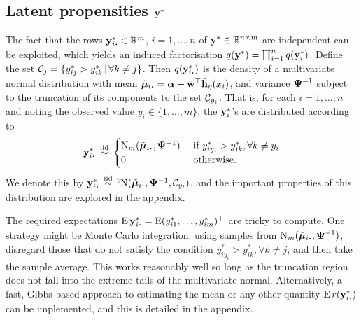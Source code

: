 \subsection{Latent propensities \texorpdfstring{${\mathbf y}^*$}{$y^*$}}

The fact that the rows $\by_{i \bigcdot}^* \in \bbR^m$, $i=1,\dots,n$ of ${\mathbf y}^* \in \mathbb{R}^{n \times m}$ are independent can be exploited, which yields an induced factorisation $q({\mathbf y}^*) = \prod_{i=1}^n q({\mathbf y}_i^*)$.
Define the set ${\mathcal C}_j = \{y_{ij}^* > y_{ik}^* \,|\, \forall k\neq j \}$.
Then $q(\by_{i \bigcdot}^*)$ is the density of a multivariate normal distribution with mean $\tilde\bmu_{i \bigcdot} = \tilde\balpha + \tilde\bw^\top \tilde \bh_\eta(x_i)$, and variance ${\bm\Psi}^{-1}$ subject to the truncation of its components to the set ${\mathcal C}_{y_i}$.
That is, for each $i=1,\dots,n$ and noting the observed value $y_i \in \{1,\dots,m\}$, the ${\mathbf y}_i^*$'s are distributed according to
\begin{align}\label{eq:ystardist}
  \by_{i \bigcdot}^* \iid
  \begin{cases}
    \N_m(\tilde\bmu_{i \bigcdot},  \bPsi^{-1}) & \text{ if } y_{iy_i}^* > y_{ik}^*, \forall k \neq y_i \\
    0 & \text{ otherwise}. \\
  \end{cases}
\end{align}
We denote this by $\by_{i \bigcdot}^* \iid \tN(\tilde\bmu_{i \bigcdot}, \bPsi^{-1},\cC_{y_i})$, and the important properties of this distribution are explored in the appendix.

The required expectations $\E\by_{i \bigcdot}^* = \E (y_{i1}^*,\dots,y_{im}^*)^\top$ are tricky to compute.
One strategy might be Monte Carlo integration: using samples from $\N_m(\tilde\bmu_{i \bigcdot},  \bPsi^{-1})$, disregard those that do not satisfy the condition $y_{iy_i}^* > y_{ik}^*, \forall k \neq j$, and then take the sample average.
This works reasonably well so long as the truncation region does not fall into the extreme tails of the multivariate normal.
Alternatively, a fast, Gibbs based approach to estimating the mean or any other quantity $\E r(\by_{i \bigcdot}^*)$ can be implemented, and this is detailed in the appendix.

